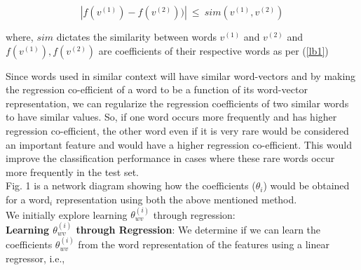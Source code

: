 \begin{equation}
|f(v^{(1)}) - f(v^{(2)}))|\ \leq\ sim(v^{(1)}, v^{(2)})
\end{equation}

where, $sim$ dictates the similarity between words $v^{(1)}$ and $v^{(2)}$ and $ f(v^{(1)}), f(v^{(2)})$ are coefficients of their respective words as per (\ref{lb1})


Since words used in similar context will have similar word-vectors and by making the regression co-efficient of a word to be a function of its word-vector representation, we can regularize the regression coefficients of two similar words to have similar values. So, if one word occurs more frequently and has higher regression co-efficient, the other word even if it is very rare would be considered an important feature and would have a higher regression co-efficient. This would improve the classification performance in cases where these rare words occur more frequently in the test set.\\


\noindent Fig. 1 is a network diagram showing how the coefficients ($\theta_{i}$) would be obtained for a word$_{i}$ representation using both the above mentioned method.\\

\noindent We initially explore learning $\theta_{wv}^{(i)}$ through regression:\\



\noindent\textbf{Learning $\theta_{wv}^{(i)}$ through Regression}: We determine if we can learn the coefficients $\theta_{wv}^{(i)}$ from the word representation of the features using a linear regressor, i.e., 

